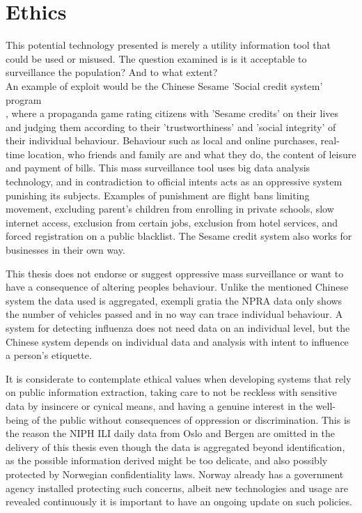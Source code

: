 \section{Ethics}
This potential technology presented is merely a utility information tool that could be used or misused. The question examined is is it acceptable to surveillance the population? And to what extent?
\\
An example of exploit would be the Chinese Sesame 'Social credit system' program\\ \cite{meissner2017china}\cite{china_botsman}\cite{china_wiki}, where a propaganda game rating citizens with 'Sesame credits' on their lives and judging them according to their 'trustworthiness' and 'social integrity' of their individual behaviour. Behaviour such as local and online purchases, real-time location, who friends and family are and what they do, the content of leisure and payment of bills. This mass surveillance tool uses big data analysis technology, and in contradiction to official intents acts as an oppressive system punishing its subjects. Examples of punishment are flight bans limiting movement, excluding parent's children from enrolling in private schools, slow internet access, exclusion from certain jobs, exclusion from hotel services, and forced registration on a public blacklist. The Sesame credit system also works for businesses in their own way.

This thesis does not endorse or suggest oppressive mass surveillance or want to have a consequence of altering peoples behaviour. Unlike the mentioned Chinese system the data used is aggregated, exempli gratia the NPRA data only shows the number of vehicles passed and in no way can trace individual behaviour. A system for detecting influenza does not need data on an individual level, but the Chinese system depends on individual data and analysis with intent to influence a person's etiquette.


It is considerate to contemplate ethical values when developing systems that rely on public information extraction, taking care to not be reckless with sensitive data by insincere or cynical means, and having a genuine interest in the well-being of the public without consequences of oppression or discrimination. This is the reason the NIPH ILI daily data from Oslo and Bergen are omitted in the delivery of this thesis even though the data is aggregated beyond identification, as the possible information derived might be too delicate, and also possibly protected by Norwegian confidentiality laws. Norway already has a government agency installed protecting such concerns\cite{datatilsynet}, albeit new technologies and usage are revealed continuously it is important to have an ongoing update on such policies.













